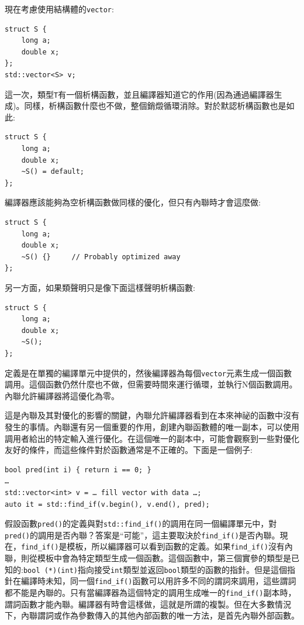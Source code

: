 現在考慮使用結構體的\texttt{vector}:

\begin{lstlisting}[style=styleCXX]
struct S {
	long a;
	double x;
};
std::vector<S> v;
\end{lstlisting}

這一次，類型\texttt{T}有一個析構函數，並且編譯器知道它的作用(因為通過編譯器生成)。同樣，析構函數什麼也不做，整個銷燬循環消除。對於默認析構函數也是如此:

\begin{lstlisting}[style=styleCXX]
struct S {
	long a;
	double x;
	~S() = default;
};
\end{lstlisting}

編譯器應該能夠為空析構函數做同樣的優化，但只有內聯時才會這麼做:

\begin{lstlisting}[style=styleCXX]
struct S {
	long a;
	double x;
	~S() {}     // Probably optimized away
};
\end{lstlisting}

另一方面，如果類聲明只是像下面這樣聲明析構函數:

\begin{lstlisting}[style=styleCXX]
struct S {
	long a;
	double x;
	~S();
};
\end{lstlisting}

定義是在單獨的編譯單元中提供的，然後編譯器為每個\texttt{vector}元素生成一個函數調用。這個函數仍然什麼也不做，但需要時間來運行循環，並執行N個函數調用。內聯允許編譯器將這優化為零。

這是內聯及其對優化的影響的關鍵，內聯允許編譯器看到在本來神祕的函數中沒有發生的事情。內聯還有另一個重要的作用，創建內聯函數體的唯一副本，可以使用調用者給出的特定輸入進行優化。在這個唯一的副本中，可能會觀察到一些對優化友好的條件，而這些條件對於函數通常是不正確的。下面是一個例子:

\begin{lstlisting}[style=styleCXX]
bool pred(int i) { return i == 0; }
… 
std::vector<int> v = … fill vector with data …;
auto it = std::find_if(v.begin(), v.end(), pred);
\end{lstlisting}

假設函數\texttt{pred()}的定義與對\texttt{std::find\_if()}的調用在同一個編譯單元中，對\texttt{pred()}的調用是否內聯？答案是“可能”，這主要取決於\texttt{find\_if()}是否內聯。現在，\texttt{find\_if()}是模板，所以編譯器可以看到函數的定義。如果\texttt{find\_if()}沒有內聯，則從模板中會為特定類型生成一個函數。這個函數中，第三個實參的類型是已知的:\texttt{bool (*)(int)}指向接受\texttt{int}類型並返回\texttt{bool}類型的函數的指針。但是這個指針在編譯時未知，同一個\texttt{find\_if()}函數可以用許多不同的謂詞來調用，這些謂詞都不能是內聯的。只有當編譯器為這個特定的調用生成唯一的\texttt{find\_if()}副本時，謂詞函數才能內聯。編譯器有時會這樣做，這就是所謂的複製。但在大多數情況下，內聯謂詞或作為參數傳入的其他內部函數的唯一方法，是首先內聯外部函數。 

